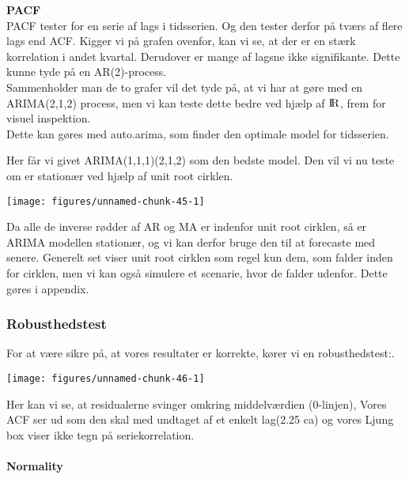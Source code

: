\documentclass[
  10pt,
]{article}
\begin{document}
\newpage

\textbf{PACF}\\
PACF tester for en serie af lags i tidsserien. Og den tester derfor på
tværs af flere lags end ACF. Kigger vi på grafen ovenfor, kan vi se, at
der er en stærk korrelation i andet kvartal. Derudover er mange af
lagsne ikke signifikante. Dette kunne tyde på en AR(2)-process.\\

Sammenholder man de to grafer vil det tyde på, at vi har at gøre med en
ARIMA(2,1,2) process, men vi kan teste dette bedre ved hjælp af
\({\rm I\!R}\), frem for visuel inspektion.\\
Dette kan gøres med auto.arima, som finder den optimale model for
tidsserien.

Her får vi givet ARIMA(1,1,1)(2,1,2) som den bedste model. Den vil vi nu
teste om er stationær ved hjælp af unit root cirklen.

\begin{center}\texttt{[image: figures/unnamed-chunk-45-1]} \end{center}

Da alle de inverse rødder af AR og MA er indenfor unit root cirklen, så
er ARIMA modellen stationær, og vi kan derfor bruge den til at forecaste
med senere. Generelt set viser unit root cirklen som regel kun dem, som
falder inden for cirklen, men vi kan også simulere et scenarie, hvor de
falder udenfor. Dette gøres i appendix.

\newpage

\hypertarget{robusthedstest}{%
\subsubsection{Robusthedstest}\label{robusthedstest}}

For at være sikre på, at vores resultater er korrekte, kører vi en
robusthedstest:.

\begin{center}\texttt{[image: figures/unnamed-chunk-46-1]} \end{center}

Her kan vi se, at residualerne svinger omkring middelværdien (0-linjen),
Vores ACF ser ud som den skal med undtaget af et enkelt lag(2.25 ca) og
vores Ljung box viser ikke tegn på seriekorrelation.\\

\hypertarget{normality}{%
\paragraph{Normality}\label{normality}}
\end{document}
